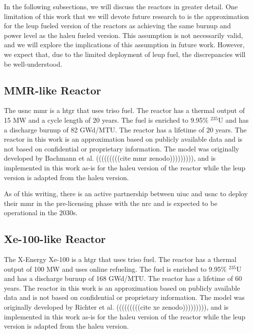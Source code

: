 In the following subsections, we will discuss the reactors in greater detail. One limitation of this work that we will devote future research to is the approximation for the \gls{leup} fueled version of the reactors as achieving the same burnup and power level as the \gls{haleu} fueled version. This assumption is not necessarily valid, and we will explore the implications of this assumption in future work. However, we expect that, due to the limited deployment of \gls{leup} fuel, the discrepancies will be well-understood.

\subsection{MMR-like Reactor}
\label{sec:mmr}

The \gls{usnc} \gls{mmr} is a \gls{htgr} that uses \gls{triso} fuel. The reactor has a thermal output of 15 MW and a cycle length of 20 years. The fuel is enriched to 9.95\% $^{235}$U and has a discharge burnup of 82 GWd/MTU. The reactor has a lifetime of 20 years. The reactor in this work is an approximation based on publicly available data and is not based on confidential or proprietary information. The model was originally developed by Bachmann et al. (((((((((cite mmr zenodo))))))))), and is implemented in this work as-is for the \gls{haleu} version of the reactor while the \gls{leup} version is adapted from the \gls{haleu} version.

As of this writing, there is an active partnership between \gls{uiuc} and \gls{usnc} to deploy their \gls{mmr} in the pre-licensing phase with the \gls{nrc} and is expected to be operational in the 2030s.


\subsection{Xe-100-like Reactor}
\label{sec:xe}

The X-Energy Xe-100 is a \gls{htgr} that uses \gls{triso} fuel. The reactor has a thermal output of 100 MW and uses online refueling. The fuel is enriched to 9.95\% $^{235}$U and has a discharge burnup of 168 GWd/MTU. The reactor has a lifetime of 60 years. The reactor in this work is an approximation based on publicly available data and is not based on confidential or proprietary information. The model was originally developed by Richter et al. (((((((((cite xe zenodo))))))))), and is implemented in this work as-is for the \gls{haleu} version of the reactor while the \gls{leup} version is adapted from the \gls{haleu} version.

